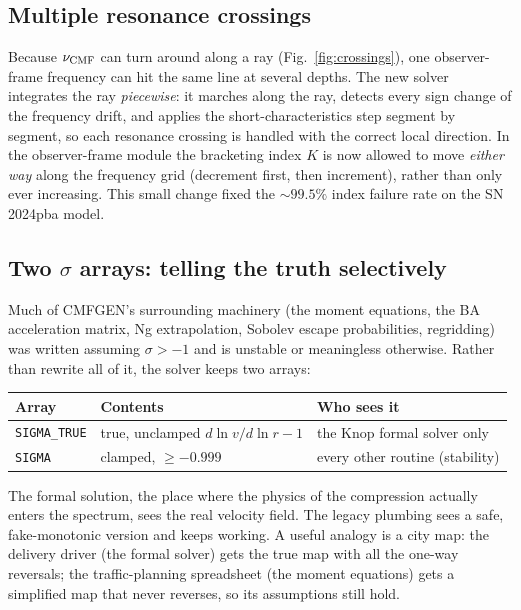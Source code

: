 \documentclass[11pt,a4paper]{article}
\newcommand{\code}[1]{\texttt{#1}}
\begin{document}
\subsection{Multiple resonance crossings}

Because $\nu_{\rm CMF}$ can turn around along a ray
(Fig.~\ref{fig:crossings}), one observer-frame frequency can hit the
same line at several depths.  The new solver integrates the ray
\emph{piecewise}: it marches along the ray, detects every sign change
of the frequency drift, and applies the short-characteristics step
segment by segment, so each resonance crossing is handled with the
correct local direction.  In the observer-frame module the bracketing
index $K$ is now allowed to move \emph{either way} along the frequency
grid (decrement first, then increment), rather than only ever
increasing.  This small change fixed the ${\sim}99.5\%$ index failure
rate on the SN\,2024pba model.

\subsection{Two $\sigma$ arrays: telling the truth selectively}
\label{sec:dual-sigma}

Much of CMFGEN's surrounding machinery (the moment equations, the BA
acceleration matrix, Ng extrapolation, Sobolev escape probabilities,
regridding) was written assuming $\sigma > -1$ and is unstable or
meaningless otherwise.  Rather than rewrite all of it, the solver keeps
two arrays:

\begin{center}
\begin{tabular}{lll}
\toprule
Array & Contents & Who sees it \\
\midrule
\code{SIGMA\_TRUE} & true, unclamped $d\ln v/d\ln r - 1$ &
   the Knop formal solver only \\
\code{SIGMA}       & clamped, $\ge -0.999$ &
   every other routine (stability) \\
\bottomrule
\end{tabular}
\end{center}

The formal solution, the place where the physics of the compression
actually enters the spectrum, sees the real velocity field.  The legacy
plumbing sees a safe, fake-monotonic version and keeps working.  A
useful analogy is a city map: the delivery driver (the formal solver)
gets the true map with all the one-way reversals; the traffic-planning
spreadsheet (the moment equations) gets a simplified map that never
reverses, so its assumptions still hold.
\end{document}
